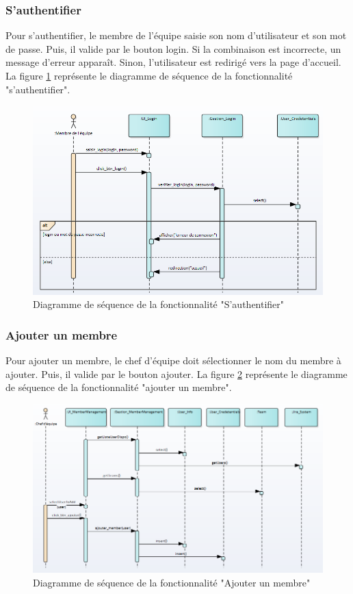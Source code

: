 \subsubsection{S'authentifier}
Pour s'authentifier, le membre de l'équipe saisie son nom d'utilisateur et son mot de passe. Puis, il valide par le bouton login. Si la combinaison est incorrecte, un message d'erreur apparaît. Sinon, l'utilisateur est redirigé vers la page d'accueil.
La figure \ref{code57} représente le diagramme de séquence de la fonctionnalité "s'authentifier".
\begin{figure}[H]
  \centering
  \includegraphics[scale=0.7]{figures/diagrams/sequence/authentification_seq_diag.png}
  \caption{Diagramme de séquence de la fonctionnalité "S'authentifier"}
  \label{code57}
\end{figure}

\subsubsection{Ajouter un membre}
Pour ajouter un membre, le chef d'équipe doit sélectionner le nom du membre à ajouter. Puis, il valide par le bouton ajouter.
La figure \ref{code58} représente le diagramme de séquence de la fonctionnalité "ajouter un membre".
\begin{figure}[H]
  \centering
 \includegraphics[scale=0.7]{figures/diagrams/sequence/ajoutermembre_seq_diag.png}
 \caption{Diagramme de séquence de la fonctionnalité "Ajouter un membre"}
 \label{code58}
\end{figure}


